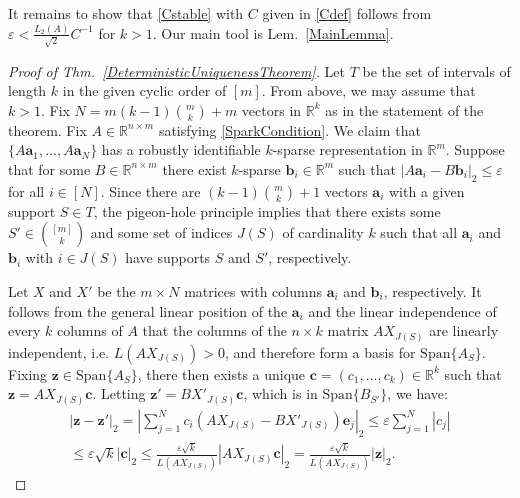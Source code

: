 \documentclass[journal, twocolumn]{IEEEtran}
\begin{document}
It remains to show that \eqref{Cstable} with $C$ given in \eqref{Cdef} follows from $\varepsilon < \frac{L_2(A)}{\sqrt{2}}C^{-1}$ for $k > 1$. Our main tool is Lem.~\ref{MainLemma}.

\begin{proof}[Proof of Thm.~\ref{DeterministicUniquenessTheorem}]
Let $T$ be the set of intervals of length $k$ in the given cyclic order of $[m]$. From above, we may assume that $k > 1$. Fix $N = m(k-1){m \choose k}+m$ vectors in $\mathbb{R}^k$ as in the statement of the theorem. Fix $A \in \mathbb{R}^{n \times m}$ satisfying \eqref{SparkCondition}. We claim that $\{A\mathbf{a}_1, \ldots, A\mathbf{a}_N\}$ has a robustly identifiable $k$-sparse representation in $\mathbb{R}^m$. Suppose that for some $B \in \mathbb{R}^{n \times m}$ there exist $k$-sparse $\mathbf{b}_i \in \mathbb{R}^m$ such that $|A\mathbf{a}_i - B\mathbf{b}_i|_2 \leq \varepsilon$ for all $i \in [N]$. Since there are $(k-1){m \choose k}+1$ vectors $\mathbf{a}_i$ with a given support $S \in T$, the pigeon-hole principle implies that there exists some $S' \in {[m] \choose k}$ and some set of indices $J(S)$ of cardinality $k$ such that all $\mathbf{a}_i$ and $\mathbf{b}_i$ with $i \in J(S)$ have supports $S$ and $S'$, respectively.

Let $X$ and $X'$ be the $m \times N$ matrices with columns $\mathbf{a}_i$ and $\mathbf{b}_i$, respectively. It follows from the general linear position of the $\mathbf{a}_i$ and the linear independence of every $k$ columns of $A$ that the columns of the $n \times k$ matrix $AX_{J(S)}$ are linearly independent, i.e. $L(AX_{J(S)}) > 0$, and therefore form a basis for $\text{Span}\{A_{S}\}$. Fixing $\mathbf{z} \in \text{Span}\{A_{S}\}$, there then exists a unique $\mathbf{c} = (c_1, \ldots, c_k) \in \mathbb{R}^k$ such that $\mathbf{z} = AX_{J(S)}\mathbf{c}$. Letting $\mathbf{z'} = BX'_{J(S)}\mathbf{c}$, which is in $\text{Span}\{B_{S'}\}$, we have:
\begin{align*}
|\mathbf{z} - \mathbf{z'}|_2 
= |\sum_{j=1}^N c_i(AX_{J(S)} - BX'_{J(S)})\mathbf{e}_j|_2 
\leq \varepsilon \sum_{j=1}^N |c_j| \\
\leq \varepsilon \sqrt{k}  |\mathbf{c}|_2 
\leq \frac{\varepsilon \sqrt{k}}{L(AX_{J(S)})} |AX_{J(S)}\mathbf{c}|_2 = \frac{\varepsilon \sqrt{k}}{L(AX_{J(S)})} |\mathbf{z}|_2.
\end{align*}


\end{proof}
\end{document}
